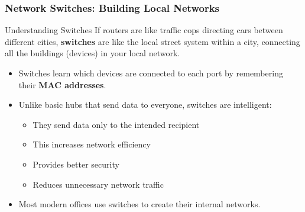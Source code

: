\documentclass{beamer}
\begin{document}
\begin{frame}
    \frametitle{Network Switches: Building Local Networks}
    
    \begin{block}{Understanding Switches}
        If routers are like traffic cops directing cars between different cities, \textbf{switches} are like the local street system within a city, connecting all the buildings (devices) in your local network.
    \end{block}
    
    \begin{itemize}
        \item Switches learn which devices are connected to each port by remembering their \textbf{MAC addresses}.
        
        \item Unlike basic hubs that send data to everyone, switches are intelligent:
        \begin{itemize}
            \item They send data only to the intended recipient
            \item This increases network efficiency
            \item Provides better security
            \item Reduces unnecessary network traffic
        \end{itemize}
        
        \item Most modern offices use switches to create their internal networks.
    \end{itemize}
\end{frame}
\end{document}
